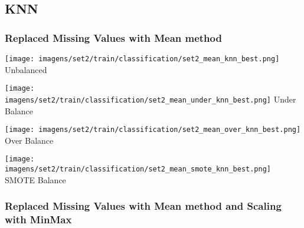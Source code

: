 \documentclass[11pt]{article}
\begin{document}
\subsection*{KNN}

\subsubsection*{Replaced Missing Values with Mean method}

\begin{figure*}[!htp]
    \begin{minipage}[!htp]{.25\textwidth}
        \centering
        \texttt{[image: imagens/set2/train/classification/set2\_mean\_knn\_best.png]}
        Unbalanced
    \end{minipage}\hfill
    \begin{minipage}[!htp]{.25\textwidth}
        \centering
        \texttt{[image: imagens/set2/train/classification/set2\_mean\_under\_knn\_best.png]}
        Under Balance
    \end{minipage}\hfill
    \begin{minipage}[!htp]{.25\textwidth}
        \centering
        \texttt{[image: imagens/set2/train/classification/set2\_mean\_over\_knn\_best.png]}
        Over Balance
    \end{minipage}\hfill
    \begin{minipage}[!htp]{.25\textwidth}
        \centering
        \texttt{[image: imagens/set2/train/classification/set2\_mean\_smote\_knn\_best.png]}
        SMOTE Balance
    \end{minipage}
\end{figure*}

\subsubsection*{Replaced Missing Values with Mean method and Scaling with MinMax}
\end{document}
